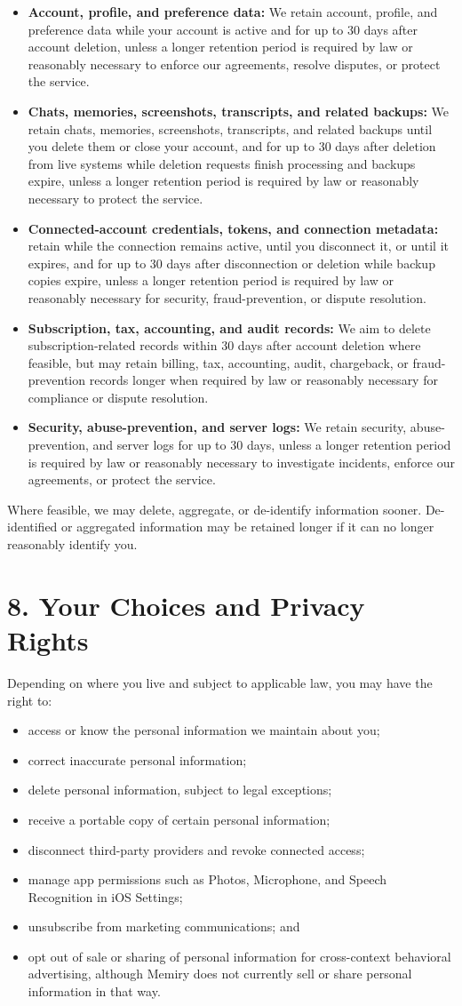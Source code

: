 \documentclass[11pt]{article}
\newcommand{\RetentionAccount}{We retain account, profile, and preference data while your account is active and for up to 30 days after account deletion, unless a longer retention period is required by law or reasonably necessary to enforce our agreements, resolve disputes, or protect the service.}
\newcommand{\RetentionContent}{We retain chats, memories, screenshots, transcripts, and related backups until you delete them or close your account, and for up to 30 days after deletion from live systems while deletion requests finish processing and backups expire, unless a longer retention period is required by law or reasonably necessary to protect the service.}
\newcommand{\RetentionBilling}{We aim to delete subscription-related records within 30 days after account deletion where feasible, but may retain billing, tax, accounting, audit, chargeback, or fraud-prevention records longer when required by law or reasonably necessary for compliance or dispute resolution.}
\newcommand{\RetentionLogs}{We retain security, abuse-prevention, and server logs for up to 30 days, unless a longer retention period is required by law or reasonably necessary to investigate incidents, enforce our agreements, or protect the service.}
\begin{document}
\begin{itemize}
  \item \textbf{Account, profile, and preference data:} \RetentionAccount
  \item \textbf{Chats, memories, screenshots, transcripts, and related backups:} \RetentionContent
  \item \textbf{Connected-account credentials, tokens, and connection metadata:} retain while the connection remains active, until you disconnect it, or until it expires, and for up to 30 days after disconnection or deletion while backup copies expire, unless a longer retention period is required by law or reasonably necessary for security, fraud-prevention, or dispute resolution.
  \item \textbf{Subscription, tax, accounting, and audit records:} \RetentionBilling
  \item \textbf{Security, abuse-prevention, and server logs:} \RetentionLogs
\end{itemize}

Where feasible, we may delete, aggregate, or de-identify information sooner. De-identified or aggregated information may be retained longer if it can no longer reasonably identify you.

\section*{8. Your Choices and Privacy Rights}

Depending on where you live and subject to applicable law, you may have the right to:

\begin{itemize}
  \item access or know the personal information we maintain about you;
  \item correct inaccurate personal information;
  \item delete personal information, subject to legal exceptions;
  \item receive a portable copy of certain personal information;
  \item disconnect third-party providers and revoke connected access;
  \item manage app permissions such as Photos, Microphone, and Speech Recognition in iOS Settings;
  \item unsubscribe from marketing communications; and
  \item opt out of sale or sharing of personal information for cross-context behavioral advertising, although Memiry does not currently sell or share personal information in that way.
\end{itemize}
\end{document}

